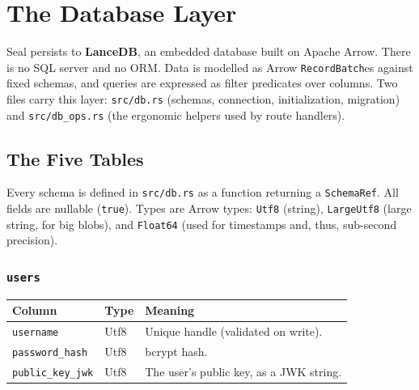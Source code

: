 \chapter{The Database Layer}
\label{chap:database}

Seal persists to \textbf{LanceDB}, an embedded database built on Apache Arrow.
There is no SQL server and no ORM. Data is modelled as Arrow \verb|RecordBatch|es
against fixed schemas, and queries are expressed as filter predicates over
columns. Two files carry this layer: \verb|src/db.rs| (schemas, connection,
initialization, migration) and \verb|src/db_ops.rs| (the ergonomic helpers used
by route handlers).

\section{The Five Tables}

Every schema is defined in \verb|src/db.rs| as a function returning a
\verb|SchemaRef|. All fields are nullable (\verb|true|). Types are Arrow types:
\verb|Utf8| (string), \verb|LargeUtf8| (large string, for big blobs), and
\verb|Float64| (used for timestamps and, thus, sub-second precision).

\subsection*{\texttt{users}}
\begin{center}
\begin{tabular}{@{}lll@{}}
\toprule
\textbf{Column} & \textbf{Type} & \textbf{Meaning} \\
\midrule
\verb|username| & Utf8 & Unique handle (validated on write). \\
\verb|password_hash| & Utf8 & bcrypt hash. \\
\verb|public_key_jwk| & Utf8 & The user's public key, as a JWK string. \\
\bottomrule
\end{tabular}
\end{center}

